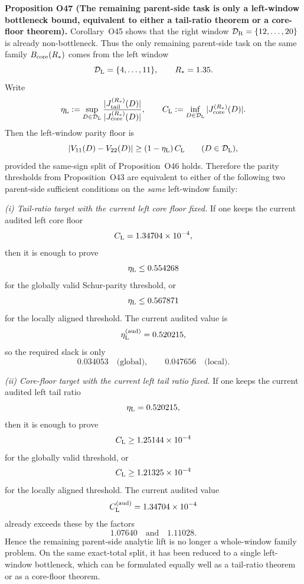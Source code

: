 \documentclass[aps,prd,onecolumn,notitlepage,nofootinbib,superscriptaddress,11pt,floatfix]{revtex4-2}
\begin{document}
\medskip\noindent\textbf{Proposition O47 (The remaining parent-side task is only a left-window bottleneck bound, equivalent to either a tail-ratio theorem or a core-floor theorem).}
Corollary~O45 shows that the right window \(\mathcal D_{\rm R}=\{12,\dots,20\}\) is already non-bottleneck.  Thus the only remaining parent-side task on the same family \(B_{\rm core}(R_\ast)\) comes from the left window
\[
\mathcal D_{\rm L}=\{4,\dots,11\},
\qquad
R_\ast=1.35.
\]
Write
\[
\eta_{\rm L}
:=
\sup_{D\in\mathcal D_{\rm L}}
\frac{|J_{\rm tail}^{(R_\ast)}(D)|}{|J_{\rm core}^{(R_\ast)}(D)|},
\qquad
C_{\rm L}
:=
\inf_{D\in\mathcal D_{\rm L}}
|J_{\rm core}^{(R_\ast)}(D)|.
\]
Then the left-window parity floor is
\[
|V_{11}(D)-V_{22}(D)|
\ge
(1-\eta_{\rm L})\,C_{\rm L}
\qquad
(D\in\mathcal D_{\rm L}),
\]
provided the same-sign split of Proposition~O46 holds.  Therefore the parity thresholds from Proposition~O43 are equivalent to either of the following two parent-side sufficient conditions on the \emph{same} left-window family:

\emph{(i) Tail-ratio target with the current left core floor fixed.}  
If one keeps the current audited left core floor
\[
C_{\rm L}=1.34704\times10^{-4},
\]
then it is enough to prove
\[
\eta_{\rm L}\le 0.554268
\]
for the globally valid Schur-parity threshold, or
\[
\eta_{\rm L}\le 0.567871
\]
for the locally aligned threshold.  The current audited value is
\[
\eta_{\rm L}^{\rm(aud)}=0.520215,
\]
so the required slack is only
\[
0.034053
\quad\text{(global)},\qquad
0.047656
\quad\text{(local)}.
\]

\emph{(ii) Core-floor target with the current left tail ratio fixed.}  
If one keeps the current audited left tail ratio
\[
\eta_{\rm L}=0.520215,
\]
then it is enough to prove
\[
C_{\rm L}\ge 1.25144\times10^{-4}
\]
for the globally valid threshold, or
\[
C_{\rm L}\ge 1.21325\times10^{-4}
\]
for the locally aligned threshold.  The current audited value
\[
C_{\rm L}^{\rm(aud)}=1.34704\times10^{-4}
\]
already exceeds these by the factors
\[
1.07640
\quad\text{and}\quad
1.11028.
\]
Hence the remaining parent-side analytic lift is no longer a whole-window family problem.  On the same exact-total split, it has been reduced to a single left-window bottleneck, which can be formulated equally well as a tail-ratio theorem or as a core-floor theorem.
\end{document}
